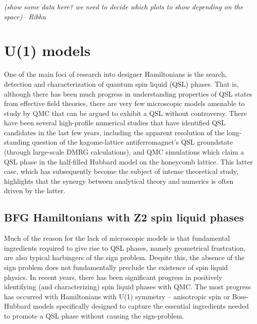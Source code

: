 \documentclass[aps,prb,groupedaddress,twocolumn]{revtex4}
\begin{document}
{\em (show some data here? we need to decide which plots to show
  depending on the space)-- Ribhu}
\section{U(1) models}

One of the main foci of research into designer Hamiltonians is the search, detection and characterization of quantum spin liquid (QSL) phases.  
That is, although there has been much progress in understanding properties of QSL states from effective field theories, there are very few microscopic models amenable to study by QMC that can be argued to exhibit a QSL without controversy.
There have been several high-profile numerical studies that have identified QSL candidates in the last few years, including the apparent resolution of the long-standing question of the kagome-lattice antiferromagnet's QSL groundstate (through large-scale DMRG calculations), and QMC simulations which claim a QSL phase in the half-filled Hubbard model on the honeycomb lattice.  This latter case, which has subsequently become the subject of intense theoretical study, highlights that the synergy between analytical theory and numerics is often driven by the latter.

\subsection{BFG Hamiltonians with Z2 spin liquid phases}

Much of the reason for the lack of microscopic models is that fundamental ingredients required to give rise to QSL phases, namely geometrical frustration, are also typical harbingers of the sign problem.  Despite this,  the absence of the sign problem does not fundamentally preclude the existence of spin liquid physics.  In recent years, there has been significant progress in positively identifying (and characterizing) spin liquid phases with QMC.  The most progress has occurred with Hamiltonians with U(1) symmetry -- anisotropic spin or Bose-Hubbard models specifically designed to capture the essential ingredients needed to promote a QSL phase without causing the sign-problem.

\end{document}
